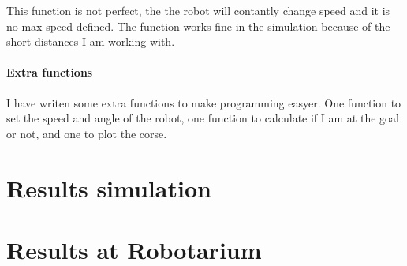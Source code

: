 \documentclass{article}
\begin{document}
        This function is not perfect, the the robot will contantly change speed and it is no max speed defined. The function works fine in the simulation because of the short distances I am working with.

    \paragraph{Extra functions}
        I have writen some extra functions to make programming easyer. One function to set the speed and angle of the robot, one function to calculate if I am at the goal or not, and one to plot the corse.

    \section{Results simulation}

    \section{Results at Robotarium}
\end{document}
